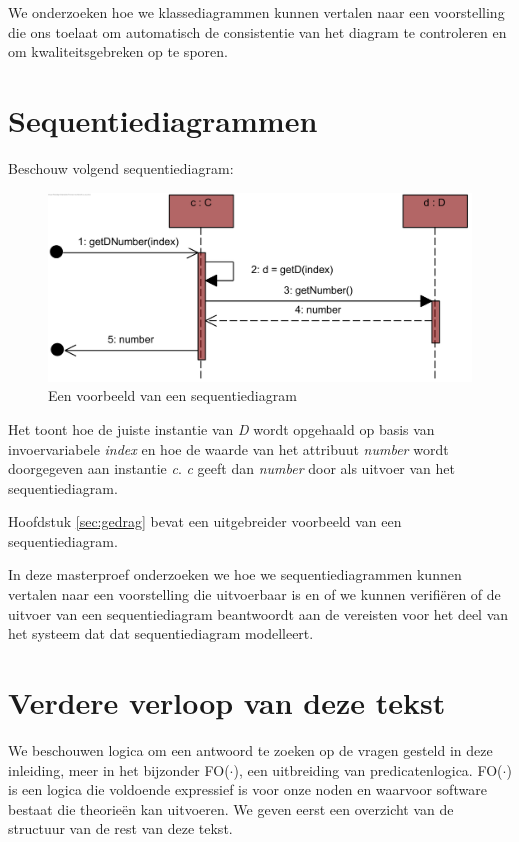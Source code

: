 We onderzoeken hoe we klassediagrammen kunnen vertalen naar een voorstelling die ons toelaat om automatisch de consistentie van het diagram te controleren en om kwaliteitsgebreken op te sporen.

\section{Sequentiediagrammen}

Beschouw volgend sequentiediagram:

\begin{figure}[H]
	\label{fig:sd}
	\centering
	\includegraphics{intro/sd.png}
	\caption{Een voorbeeld van een sequentiediagram}
\end{figure}

Het toont hoe de juiste instantie van \textit{D} wordt opgehaald op basis van invoervariabele \textit{index} en hoe de waarde van het attribuut \textit{number} wordt doorgegeven aan instantie \textit{c}. \textit{c} geeft dan \textit{number} door als uitvoer van het sequentiediagram.

Hoofdstuk \ref{sec:gedrag} bevat een uitgebreider voorbeeld van een sequentiediagram.

In deze masterproef onderzoeken we hoe we sequentiediagrammen kunnen vertalen naar een voorstelling die uitvoerbaar is en of we kunnen verifi\"eren of de uitvoer van een sequentiediagram beantwoordt aan de vereisten voor het deel van het systeem dat dat sequentiediagram modelleert.

\section{Verdere verloop van deze tekst}

We beschouwen logica om een antwoord te zoeken op de vragen gesteld in deze inleiding, meer in het bijzonder FO($\cdot$)\cite{DeCatBroes2014PLaa}, een uitbreiding van predicatenlogica. FO($\cdot$) is een logica die voldoende expressief is voor onze noden en waarvoor software bestaat die theorie\"en kan uitvoeren. We geven eerst een overzicht van de structuur van de rest van deze tekst.

